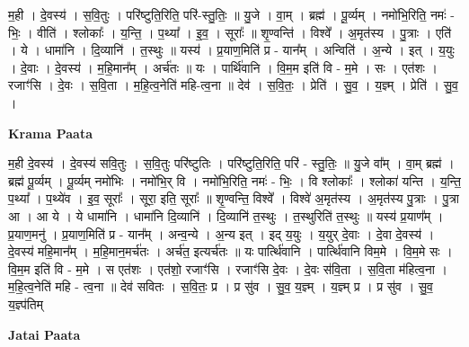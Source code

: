 \documentclass[17pt]{extarticle}
\begin{document}
म॒ही । दे॒वस्य॑ । स॒वि॒तुः । परि॑ष्टुति॒रिति॒ परि॑-स्तु॒तिः॒ ॥ यु॒जे । वा॒म् । ब्रह्म॑ । पू॒र्व्यम् । नमो॑भि॒रिति॒ नमः॑ - भिः॒ । वीति॑ । श्लोकाः᳚ । य॒न्ति॒ । प॒थ्या᳚ । इ॒व॒ । सूराः᳚ ॥ शृ॒ण्वन्ति॑ । विश्वे᳚ । अ॒मृत॑स्य । पु॒त्राः । एति॑ । ये । धामा॑नि । दि॒व्यानि॑ । त॒स्थुः ॥ यस्य॑ । प्र॒याण॒मिति॑ प्र - यान᳚म् । अन्विति॑ । अ॒न्ये । इत् । य॒युः । दे॒वाः । दे॒वस्य॑ । म॒हि॒मान᳚म् । अर्च॑तः ॥ यः । पार्थि॑वानि । वि॒म॒म इति॑ वि - म॒मे । सः । एत॑शः । रजाꣳ॑सि । दे॒वः । स॒वि॒ता । म॒हि॒त्व॒नेति॑ महि-त्व॒ना ॥ देव॑ । स॒वि॒तः॒ । प्रेति॑ । सु॒व॒ । य॒ज्ञ्म् । प्रेति॑ । सु॒व॒ ।  \newline


\textbf{Krama Paata} \newline

म॒ही दे॒वस्य॑ । दे॒वस्य॑ सवि॒तुः । स॒वि॒तुः परि॑ष्टुतिः । परि॑ष्टुति॒रिति॒ परि॑ - स्तु॒तिः॒ ॥ यु॒जे वा᳚म् । वा॒म् ब्रह्म॑ । ब्रह्म॑ पू॒र्व्यम् । पू॒र्व्यम् नमो॑भिः । नमो॑भि॒र् वि । नमो॑भि॒रिति॒ नमः॑ - भिः॒ । वि श्लोकाः᳚ । श्लोका॑ यन्ति । य॒न्ति॒ प॒थ्या᳚ । प॒थ्ये॑व । इ॒व॒ सूराः᳚ । सूरा॒ इति॒ सूराः᳚ ॥ शृ॒ण्वन्ति॒ विश्वे᳚ । विश्वे॑ अ॒मृत॑स्य । अ॒मृत॑स्य पु॒त्राः । पु॒त्रा आ । आ ये । ये धामा॑नि । धामा॑नि दि॒व्यानि॑ । दि॒व्यानि॑ त॒स्थुः । त॒स्थुरिति॑ त॒स्थुः ॥ यस्य॑ प्र॒याण᳚म् । प्र॒याण॒मनु॑ । प्र॒याण॒मिति॑ प्र - यान᳚म् । अन्व॒न्ये । अ॒न्य इत् । इद् य॒युः । य॒युर् दे॒वाः । दे॒वा दे॒वस्य॑ । दे॒वस्य॑ महि॒मान᳚म् । म॒हि॒मान॒मर्च॑तः । अर्च॑त॒ इत्यर्च॑तः ॥ यः पार्त्थि॑वानि । पार्त्थि॑वानि विम॒मे । वि॒म॒मे सः । वि॒म॒म इति॑ वि - म॒मे । 
स एत॑शः । एत॑शो॒ रजाꣳ॑सि । रजाꣳ॑सि दे॒वः । दे॒वः स॑वि॒ता । स॒वि॒ता म॑हित्व॒ना । म॒हि॒त्व॒नेति॑ महि - त्व॒ना ॥ देव॑ सवितः । स॒वि॒तः॒ प्र । प्र सु॑व । सु॒व॒ य॒ज्ञ्म् । य॒ज्ञ्म् प्र । प्र सु॑व । सु॒व॒ य॒ज्ञ्प॑तिम् \newline

\textbf{Jatai Paata} \newline
\end{document}
